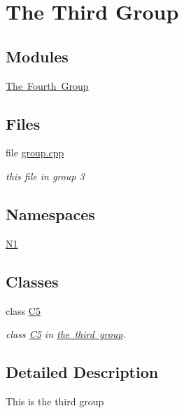\hypertarget{group__group3}{}\section{The Third Group}
\label{group__group3}
\subsection*{Modules}
\begin{DoxyCompactItemize}
\item 
\mbox{\hyperlink{group__group4}{The Fourth Group}}
\end{DoxyCompactItemize}
\subsection*{Files}
\begin{DoxyCompactItemize}
\item 
file \mbox{\hyperlink{group_8cpp}{group.\+cpp}}
\begin{DoxyCompactList}\small\item\em this file in group 3 \end{DoxyCompactList}\end{DoxyCompactItemize}
\subsection*{Namespaces}
\begin{DoxyCompactItemize}
\item 
 \mbox{\hyperlink{namespace_n1}{N1}}
\end{DoxyCompactItemize}
\subsection*{Classes}
\begin{DoxyCompactItemize}
\item 
class \mbox{\hyperlink{class_c5}{C5}}
\begin{DoxyCompactList}\small\item\em class \mbox{\hyperlink{class_c5}{C5}} in \mbox{\hyperlink{group__group3}{the third group}}. \end{DoxyCompactList}\end{DoxyCompactItemize}


\subsection{Detailed Description}
This is the third group 